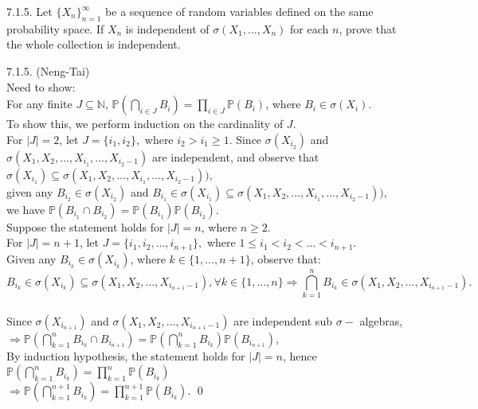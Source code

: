 \begin{exercise} \label{7.1.5}
7.1.5. Let $\{ X_n \}_{n=1}^{ \infty }$ be a sequence of random variables defined on the same probability space. If $X_n$ is independent of $\sigma (X_1,..., X_n )$ for each $n$, prove that the whole collection is independent.
\end{exercise}
\begin{answer}
    7.1.5. (Neng-Tai) 
    \\Need to show:
    \\For any finite $J \subseteq \mathbb{N}$,
    $\mathbb{P}(\bigcap_{i \in J }B_{i} ) = \prod_{i \in J} \mathbb{P}(B_i)$, where $B_{i} \in \sigma(X_i)$.
    \\ To show this, we perform induction on the cardinality of $J$.
    \\For $|J| = 2 $, let $J = \{ i_1, i_2 \},$ where $i_2 > i_1 \geq 1 $. Since $\sigma (X_{i_2})$ and $\sigma (X_{1}, X_{2}, ... ,X_{i_1},...,X_{i_2 - 1} )$ are independent, and observe that $\sigma (X_{i_1}) \subseteq \sigma (X_{1}, X_{2}, ... ,X_{i_1},...,X_{i_2 - 1} ))$, 
    \\given any $B_{i_2} \in \sigma(X_{i_2})$ and $B_{i_1} \in \sigma(X_{i_1})\subseteq \sigma (X_{1}, X_{2}, ... ,X_{i_1},...,X_{i_2 - 1} ))$,
    \\we have $\mathbb{P}(B_{i_1} \cap B_{i_2} ) = \mathbb{P}(B_{i_1}) \mathbb{P}(B_{i_2})$.
    \\Suppose the statement holds for $|J| = n$, where $n 	\geq 2$.
    \\For $|J| = n+1 $, let $J = \{ i_1, i_2,...,i_{n+1} \},$ where $1 \leq i_1 < i_2< ...< i_{n+1}$.
    \\Given  any $B_{i_k} \in \sigma(X_{i_k})$, where $k \in \{1,...,n+1\}$, observe that:
    \begin{equation*}
        B_{i_k} \in \sigma (X_{i_k}) \subseteq \sigma (X_{1}, X_{2},...,X_{i_{n+1} - 1} ), \forall k \in \{ 1,...,n \} \Longrightarrow \bigcap^{n}_{k =1}B_{i_k} \in \sigma (X_{1}, X_{2},...,X_{i_{n+1} - 1} ).
    \end{equation*}
    \\Since $\sigma (X_{i_{n+1}})$ and $\sigma (X_{1}, X_{2},...,X_{i_{n+1} - 1} )$ are independent sub $\sigma - $ algebras, 
    \\$\Longrightarrow \mathbb{P}(\bigcap^{n}_{k =1}B_{i_k} \cap B_{i_{n+1}} ) = \mathbb{P}(\bigcap^{n}_{k =1}B_{i_k}) \mathbb{P}(B_{i_{n+1}})$,
    \\By induction hypothesis, the statement holds for $|J| = n$, hence $\mathbb{P}(\bigcap^{n}_{k =1}B_{i_k}) = \prod^n_{k=1} \mathbb{P}(B_{i_k}) $
    \\$\Longrightarrow \mathbb{P}(\bigcap^{n+1}_{k =1}B_{i_k} ) = \prod^{n+1}_{k=1} \mathbb{P}(B_{i_k})$. \qquad \qed
\end{answer}

